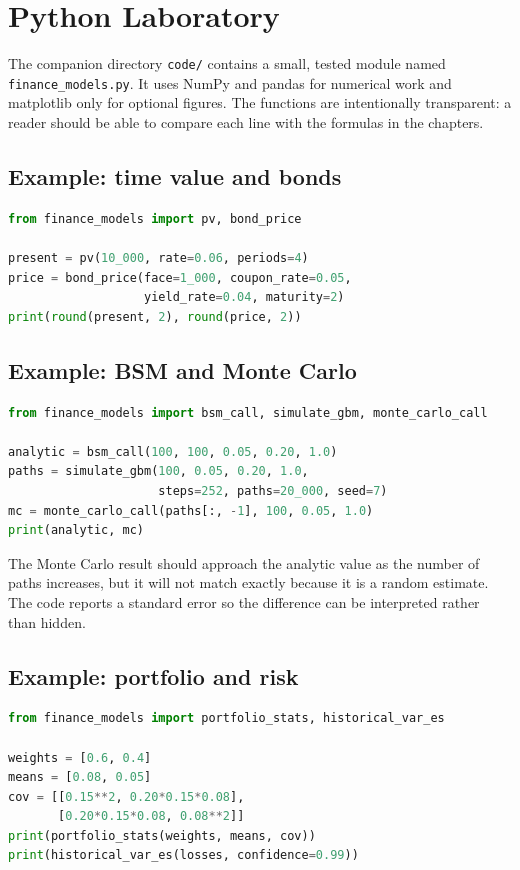 \chapter{Python Laboratory}

The companion directory \texttt{code/} contains a small, tested module named \texttt{finance\_models.py}. It uses NumPy and pandas for numerical work and matplotlib only for optional figures. The functions are intentionally transparent: a reader should be able to compare each line with the formulas in the chapters.

\section{Example: time value and bonds}
\begin{lstlisting}[language=Python]
from finance_models import pv, bond_price

present = pv(10_000, rate=0.06, periods=4)
price = bond_price(face=1_000, coupon_rate=0.05,
                   yield_rate=0.04, maturity=2)
print(round(present, 2), round(price, 2))
\end{lstlisting}

\section{Example: BSM and Monte Carlo}
\begin{lstlisting}[language=Python]
from finance_models import bsm_call, simulate_gbm, monte_carlo_call

analytic = bsm_call(100, 100, 0.05, 0.20, 1.0)
paths = simulate_gbm(100, 0.05, 0.20, 1.0,
                     steps=252, paths=20_000, seed=7)
mc = monte_carlo_call(paths[:, -1], 100, 0.05, 1.0)
print(analytic, mc)
\end{lstlisting}

The Monte Carlo result should approach the analytic value as the number of paths increases, but it will not match exactly because it is a random estimate. The code reports a standard error so the difference can be interpreted rather than hidden.

\section{Example: portfolio and risk}
\begin{lstlisting}[language=Python]
from finance_models import portfolio_stats, historical_var_es

weights = [0.6, 0.4]
means = [0.08, 0.05]
cov = [[0.15**2, 0.20*0.15*0.08],
       [0.20*0.15*0.08, 0.08**2]]
print(portfolio_stats(weights, means, cov))
print(historical_var_es(losses, confidence=0.99))
\end{lstlisting}

